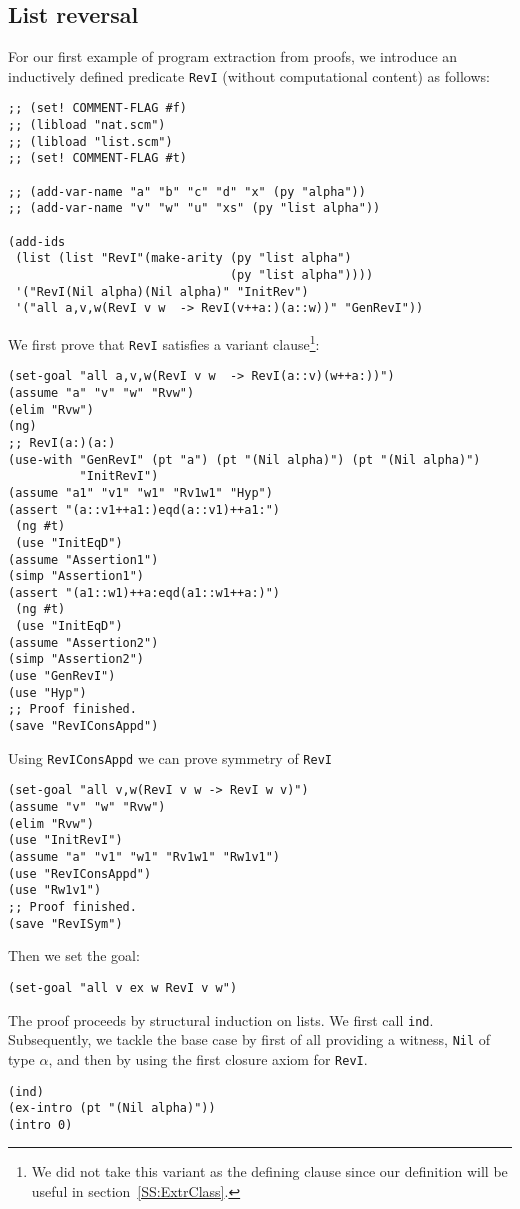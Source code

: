 \documentclass[12pt]{amsart}
\begin{document}
\subsection{List reversal}
\label{SS:ListReversal}
For our first example of program extraction from proofs, we introduce
an inductively defined predicate \texttt{RevI} (without computational
content) as follows:
\begin{verbatim}
;; (set! COMMENT-FLAG #f)
;; (libload "nat.scm")
;; (libload "list.scm")
;; (set! COMMENT-FLAG #t)

;; (add-var-name "a" "b" "c" "d" "x" (py "alpha"))
;; (add-var-name "v" "w" "u" "xs" (py "list alpha"))

(add-ids
 (list (list "RevI"(make-arity (py "list alpha")
                               (py "list alpha"))))
 '("RevI(Nil alpha)(Nil alpha)" "InitRev")
 '("all a,v,w(RevI v w  -> RevI(v++a:)(a::w))" "GenRevI"))
\end{verbatim}
We first prove that \texttt{RevI} satisfies a variant
clause\footnote{We did not take this variant as the defining clause
  since our definition will be useful in section~\ref{SS:ExtrClass}.}:
\begin{verbatim}
(set-goal "all a,v,w(RevI v w  -> RevI(a::v)(w++a:))")
(assume "a" "v" "w" "Rvw")
(elim "Rvw")
(ng)
;; RevI(a:)(a:)
(use-with "GenRevI" (pt "a") (pt "(Nil alpha)") (pt "(Nil alpha)")
          "InitRevI")
(assume "a1" "v1" "w1" "Rv1w1" "Hyp")
(assert "(a::v1++a1:)eqd(a::v1)++a1:")
 (ng #t)
 (use "InitEqD")
(assume "Assertion1")
(simp "Assertion1")
(assert "(a1::w1)++a:eqd(a1::w1++a:)")
 (ng #t)
 (use "InitEqD")
(assume "Assertion2")
(simp "Assertion2")
(use "GenRevI")
(use "Hyp")
;; Proof finished.
(save "RevIConsAppd")
\end{verbatim}
Using \texttt{RevIConsAppd} we can prove symmetry of \texttt{RevI}
\begin{verbatim}
(set-goal "all v,w(RevI v w -> RevI w v)")
(assume "v" "w" "Rvw")
(elim "Rvw")
(use "InitRevI")
(assume "a" "v1" "w1" "Rv1w1" "Rw1v1")
(use "RevIConsAppd")
(use "Rw1v1")
;; Proof finished.
(save "RevISym")
\end{verbatim}
Then we set the goal:
\begin{verbatim}
(set-goal "all v ex w RevI v w")
\end{verbatim}
The proof proceeds by structural induction on lists.  We first call
\texttt{ind}.  Subsequently, we tackle the base case by first of all
providing a witness, \texttt{Nil} of type $\alpha$, and then by using
the first closure axiom for \texttt{RevI}.
\begin{verbatim}
(ind)
(ex-intro (pt "(Nil alpha)"))
(intro 0)
\end{verbatim}
\end{document}
